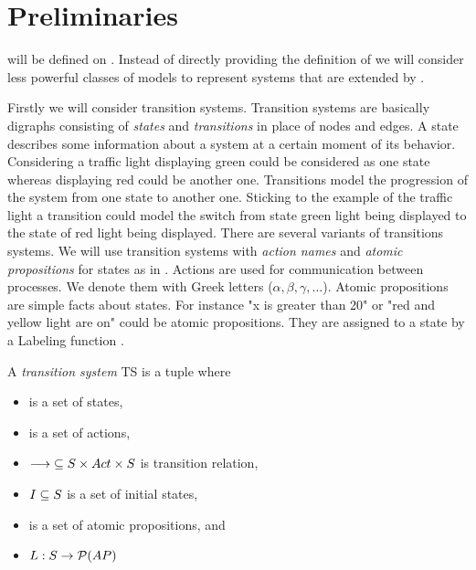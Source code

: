 \documentclass[preview]{standalone}
\begin{document}
\section{Preliminaries}

\viewsNC will be defined on \chgphsN. Instead of directly providing the definition of \chgphN we will consider less powerful classes of models to represent systems that are extended by \chgphsN.

Firstly we will consider transition systems. Transition systems are basically digraphs consisting of \emph{states} and \emph{transitions} in place of nodes and edges. A state describes some information about a system at a certain moment of its behavior. Considering a traffic light displaying green could be considered as one state whereas displaying red could be another one. Transitions model the progression of the system from one state to another one. Sticking to the example of the traffic light a transition could model the switch from state green light being displayed to the state of red light being displayed. There are several variants of transitions systems. We will use transition systems with \emph{action names} and \emph{atomic propositions} for states as in . Actions are used for communication between processes. We denote them with Greek letters ($\alpha, \beta, \gamma, \dots$). Atomic propositions are simple facts about states. For instance "x is greater than 20" or "red and yellow light are on" could be atomic propositions. They are assigned to a state by a Labeling function .


\begin{definition}
	A \emph{transition system} TS is a tuple \transitionsystem where
	\begin{itemize}
		\item \states is a set of states,
		\item \actions is a set of actions,
		\item ${\longrightarrow} \subseteq {S} \times {Act} \times {S}$ is transition relation,
		\item ${I} \subseteq {S}$ is a set of initial states,
		\item \atomicprops is a set of atomic propositions, and
		\item ${L} : {S} \to {\mathcal{P}(\ensuremath{{AP}})}$
	\end{itemize}
\end{definition}
\end{document}
